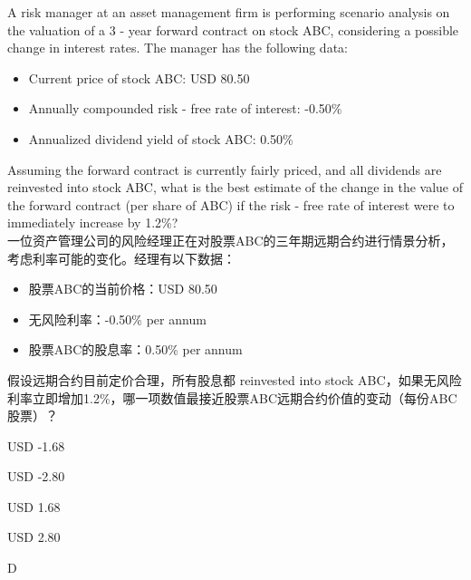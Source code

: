 \documentclass{article}
\newcounter{question} %
\begin{document}
\begin{question}
    A risk manager at an asset management firm is performing scenario analysis on the valuation of a 3 - year forward contract on stock ABC, considering a possible change in interest rates. The manager has the following data:
    \begin{itemize}
    \item Current price of stock ABC: USD 80.50
    \item Annually compounded risk - free rate of interest: -0.50\%
    \item Annualized dividend yield of stock ABC: 0.50\%
    \end{itemize}
    Assuming the forward contract is currently fairly priced, and all dividends are reinvested into stock ABC, what is the best estimate of the change in the value of the forward contract (per share of ABC) if the risk - free rate of interest were to immediately increase by 1.2\%?
    \\一位资产管理公司的风险经理正在对股票ABC的三年期远期合约进行情景分析，考虑利率可能的变化。经理有以下数据：
    \begin{itemize}
    \item 股票ABC的当前价格：USD 80.50
    \item 无风险利率：-0.50\% per annum
    \item 股票ABC的股息率：0.50\% per annum
    \end{itemize}
    假设远期合约目前定价合理，所有股息都 reinvested into stock ABC，如果无风险利率立即增加1.2\%，哪一项数值最接近股票ABC远期合约价值的变动（每份ABC股票）？
    \end{question}
    
    \begin{choices}
        \item USD -1.68
        \item USD -2.80
        \item USD 1.68
        \item USD 2.80
    \end{choices}
    
    \begin{correctanswer}
        D
    \end{correctanswer}
    
\end{document}

